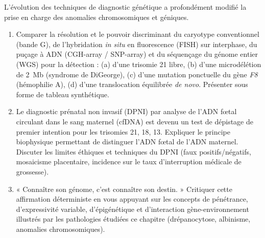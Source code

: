 \documentclass[11pt]{article}
\begin{document}
\begin{exercice}
L'évolution des techniques de diagnostic génétique a profondément modifié la prise en charge des anomalies chromosomiques et géniques.
\begin{enumerate}
    \item Comparer la résolution et le pouvoir discriminant du caryotype conventionnel (bande G), de l'hybridation \textit{in situ} en fluorescence (FISH) sur interphase, du puçage à ADN (CGH-array / SNP-array) et du séquençage du génome entier (WGS) pour la détection : (a) d'une trisomie 21 libre, (b) d'une microdélétion de \SI{2}{Mb} (syndrome de DiGeorge), (c) d'une mutation ponctuelle du gène \textit{F8} (hémophilie A), (d) d'une translocation équilibrée \textit{de novo}. Présenter sous forme de tableau synthétique.
    \item Le diagnostic prénatal non invasif (DPNI) par analyse de l'ADN fœtal circulant dans le sang maternel (cfDNA) est devenu un test de dépistage de premier intention pour les trisomies 21, 18, 13. Expliquer le principe biophysique permettant de distinguer l'ADN fœtal de l'ADN maternel. Discuter les limites éthiques et techniques du DPNI (faux positifs/négatifs, mosaicisme placentaire, incidence sur le taux d'interruption médicale de grossesse).
    \item « Connaître son génome, c'est connaître son destin. » Critiquer cette affirmation déterministe en vous appuyant sur les concepts de pénétrance, d'expressivité variable, d'épigénétique et d'interaction gène-environnement illustrés par les pathologies étudiées ce chapitre (drépanocytose, albinisme, anomalies chromosomiques).
\end{enumerate}
\end{exercice}
\end{document}
